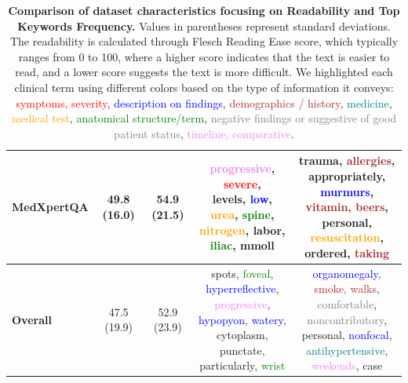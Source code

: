 \documentclass[11pt]{article}
\begin{document}
\begin{table}[b!]
\begin{tabular}{l|c|c|c|c}
\textbf{MedXpertQA}     & 49.8 {\scriptsize(16.0)} & 54.9 {\scriptsize(21.5)} & \makecell[c]{\textcolor{violet}{progressive}, \textcolor{red}{severe},\\ levels, \textcolor{blue}{low}, \textcolor{orange}{urea}, \textcolor{green}{spine}, \\ \textcolor{orange}{nitrogen}, labor, \\ \textcolor{green}{iliac}, mmoll} & \makecell[c]{trauma, \textcolor{brown}{allergies},\\ appropriately, \textcolor{blue}{murmurs}, \\ \textcolor{brown}{vitamin, beers}, \\ personal, \textcolor{orange}{resuscitation}, \\ ordered, \textcolor{brown}{taking}}\\
\bottomrule
\textbf{Overall}     & 47.5 {\scriptsize(19.9)} & 52.9 {\scriptsize(23.9)} & \makecell[c]{spots, \textcolor{green}{foveal}, \\ \textcolor{blue}{hyperreflective}, \textcolor{violet}{progressive}, \\ \textcolor{blue}{hypopyon}, \textcolor{blue}{watery}, cytoplasm, \\punctate, particularly, \textcolor{green}{wrist}} & \makecell[c]{\textcolor{blue}{organomegaly}, \\\textcolor{brown}{smoke, walks}, \\ \textcolor{gray}{comfortable}, \textcolor{gray}{noncontributory}, \\ personal, \textcolor{blue}{nonfocal}, \\ \textcolor{teal}{antihypertensive}, \textcolor{violet}{weekends}, case}\\
\bottomrule
\end{tabular}
\vspace{0.7mm}
\caption{\textbf{Comparison of dataset characteristics focusing on Readability and Top Keywords Frequency.} Values in parentheses represent standard deviations. The readability is calculated through Flesch Reading Ease score, which typically ranges from 0 to 100, where a higher score indicates that the text is easier to read, and a lower score suggests the text is more difficult. We highlighted each clinical term using different colors based on the type of information it conveys: \textcolor{red}{symptoms, severity}, \textcolor{blue}{description on findings}, \textcolor{brown}{demographics / history}, \textcolor{teal}{medicine}, \textcolor{orange}{medical test}, \textcolor{green}{anatomical structure/term}, \textcolor{gray}{negative findings or suggestive of good patient status}, \textcolor{violet}{timeline, comparative}.}
\label{tab:keyword_readability}
\end{table}
\end{document}
